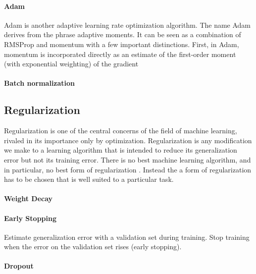 \documentclass{scrartcl}
\begin{document}
\paragraph{Adam}

Adam \cite{Kingma2014} is another adaptive learning rate optimization algorithm. The name Adam derives from the phrase adaptive moments. It can be seen as a combination of RMSProp and momentum with a few important distinctions. First, in Adam, momentum is incorporated directly as an estimate of the first-order moment (with exponential weighting) of the gradient  

\paragraph{Batch normalization}





\subsection{Regularization}

Regularization is one of the central concerns of the field of machine learning, rivaled in its importance only by optimization. Regularization is any modification we make to a learning algorithm that is intended to reduce its generalization error but not its training error. There is no best machine learning algorithm, and in particular, no best form of regularization \cite{Wolpert1996}. Instead the a form of regularization has to be chosen that is well suited to a particular task.



\paragraph{Weight Decay}


\paragraph{Early Stopping} 
Estimate generalization error with a validation set during training. Stop training when the error on the validation set rises (early stopping).

\paragraph{Dropout}
\end{document}
